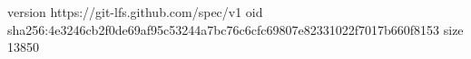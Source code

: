 version https://git-lfs.github.com/spec/v1
oid sha256:4e3246cb2f0de69af95c53244a7bc76c6cfc69807e82331022f7017b660f8153
size 13850
